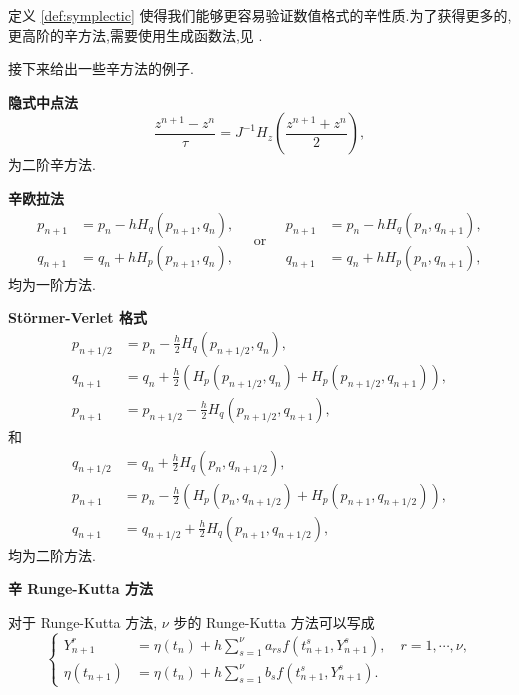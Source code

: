 \begin{remark}
{\rm 定义 \ref{def:symplectic} 使得我们能够更容易验证数值格式的辛性质.为了获得更多的,更高阶的辛方法,需要使用生成函数法,见 \cite{hairer2006geometric}.}
\end{remark}

接下来给出一些辛方法的例子.

\noindent \textbf{隐式中点法}
\begin{equation*}
\frac{z^{n+1}-z^n}{\tau}=J^{-1}H_z(\frac{z^{n+1}+z^n}{2}),
\end{equation*}
为二阶辛方法.

\noindent \textbf{辛欧拉法}
\begin{equation*}
\begin{aligned}
p_{n+1}&=p_n-hH_q(p_{n+1},q_n),\\
q_{n+1}&=q_n+hH_p(p_{n+1},q_n),
\end{aligned}
\quad \text{or} \quad
\begin{aligned}
p_{n+1}&=p_n-hH_q(p_n,q_{n+1}),\\
q_{n+1}&=q_n+hH_p(p_n,q_{n+1}),
\end{aligned}
\end{equation*}
均为一阶方法.

\noindent \textbf{St\"{o}rmer-Verlet 格式}
\begin{equation*}
\begin{aligned}
p_{n+1/2}&=p_n-\frac{h}{2}H_q(p_{n+1/2},q_n),\\
q_{n+1}&=q_n+\frac{h}{2}(H_p(p_{n+1/2},q_n)+H_p(p_{n+1/2},q_{n+1})),\\
p_{n+1}&=p_{n+1/2}-\frac{h}{2}H_q(p_{n+1/2},q_{n+1}),
\end{aligned}
\end{equation*}
和
\begin{equation*}
\begin{aligned}
q_{n+1/2}&=q_n+\frac{h}{2}H_q(p_n,q_{n+1/2}),\\
p_{n+1}&=p_n-\frac{h}{2}(H_p(p_n,q_{n+1/2})+H_p(p_{n+1},q_{n+1/2})),\\
q_{n+1}&=q_{n+1/2}+\frac{h}{2}H_q(p_{n+1},q_{n+1/2}),
\end{aligned}
\end{equation*}
均为二阶方法.

\noindent \textbf{辛 Runge-Kutta 方法}

对于 Runge-Kutta 方法, $\nu$ 步的 Runge-Kutta 方法可以写成
\begin{equation*}
  \left\lbrace
    \begin{aligned}
      Y_{n+1}^{r}&=\eta(t_{n})+h\sum_{s=1}^{\nu}a_{rs}f(t_{n+1}^{s},Y_{n+1}^{s}),\quad r=1,\cdots, \nu, \\
      \eta(t_{n+1})&=\eta(t_{n})+h\sum_{s=1}^{\nu}b_{s}f(t_{n+1}^{s},Y_{n+1}^{s}).
    \end{aligned}
  \right.
\end{equation*}

